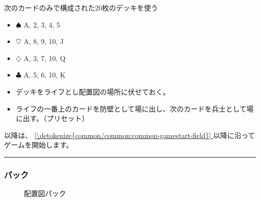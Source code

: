 \documentclass[letterpaper,10pt,dvipdfmx]{sphinxmanual}
\begin{document}
\sphinxAtStartPar
{}

\sphinxAtStartPar
次のカードのみで構成された20枚のデッキを使う
\begin{itemize}
\item {} 
\sphinxAtStartPar
{\normalsize $\spadesuit$} A, 2, 3, 4, 5

\item {} 
\sphinxAtStartPar
{\normalsize $\heartsuit$} A, 8, 9, 10, J

\item {} 
\sphinxAtStartPar
{\normalsize $\diamondsuit$} A, 3, 7, 10, Q

\item {} 
\sphinxAtStartPar
{\normalsize $\clubsuit$} A, 5, 6, 10, K

\end{itemize}

\sphinxAtStartPar
{}
\begin{itemize}
\item {} 
\sphinxAtStartPar
デッキをライフとし配置図の場所に伏せておく。

\item {} 
\sphinxAtStartPar
ライフの一番上のカードを防壁として場に出し、次のカードを兵士として場に出す。（プリセット）

\end{itemize}

\sphinxAtStartPar
以降は、 \hyperref[\detokenize{common/common:common-gamestart-field}]{\ref{\detokenize{common/common:common-gamestart-field}} } 以降に沿ってゲームを開始します。


\bigskip\hrule\bigskip



\subsubsection{パック}
\label{\detokenize{auto/framelist:frame-pack}}\label{\detokenize{auto/framelist:id4}}
\sphinxAtStartPar
{}

\begin{figure}[htbp]
\centering
\capstart

\noindent{}
\caption{配置図\sphinxhyphen{}パック}\label{\detokenize{auto/framelist:id8}}\label{\detokenize{auto/framelist:frame-pack-image}}\end{figure}

\sphinxAtStartPar
{}
\end{document}
